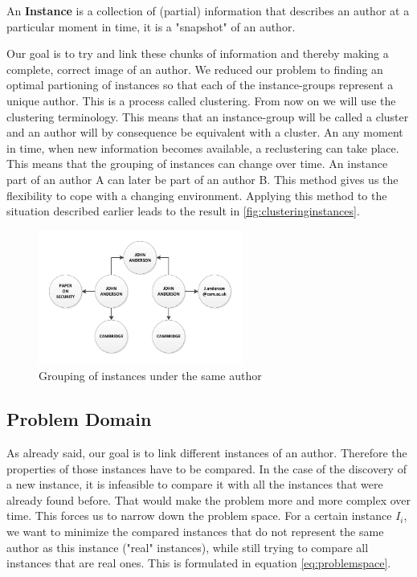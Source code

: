 \begin{mydef}
An \textbf{Instance} is a collection of (partial) information that describes an author at a particular moment in time, it is a "snapshot" of an author.
\end{mydef}

Our goal is to try and link these chunks of information and thereby making a complete, correct image of an author. We reduced our problem to finding an optimal partioning of instances so that each of the instance-groups represent a unique author. This is a process called clustering. From now on we will use the clustering terminology. This means that an instance-group will be called a cluster and an author will by consequence be equivalent with a cluster. An any moment in time, when new information becomes available, a reclustering can take place. This means that the grouping of instances can change over time. An instance part of an author A can later be part of an author B. This method gives us the flexibility to cope with a changing environment. Applying this method to the situation described earlier leads to the result in \autoref{fig:clusteringinstances}.

\begin{figure}[htb]
	\centering
		\includegraphics[width=0.6\textwidth]{fig/clusteringinstances}
	\caption{Grouping of instances under the same author}
	\label{fig:clusteringinstances}
\end{figure}

\subsection{Problem Domain}
\label{problemdomain}

As already said, our goal is to link different instances of an author. Therefore the properties of those instances have to be compared. In the case of the discovery of a new instance, it is infeasible to compare it with all the instances that were already found before. That would make the problem more and more complex over time. This forces us to narrow down the problem space. For a certain instance $I_i$, we want to minimize the compared instances that do not represent the same author as this instance ("real" instances), while still trying to compare all instances that are real ones. This is formulated in equation \autoref{eq:problemspace}.

